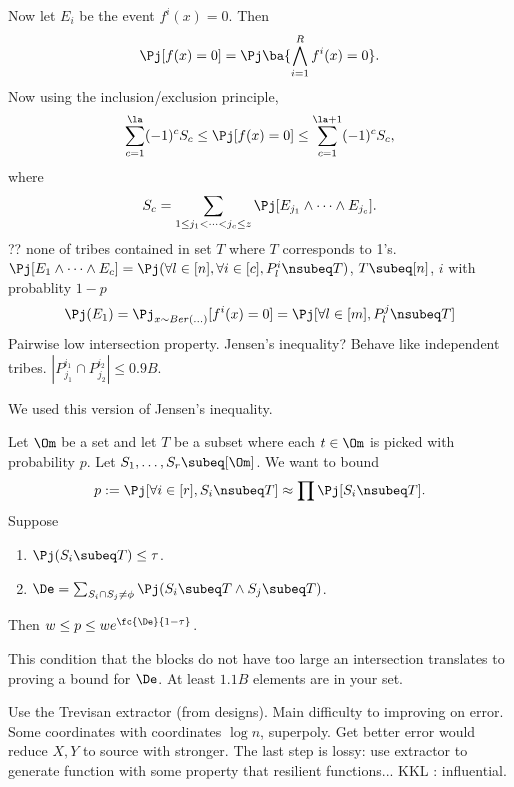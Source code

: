 \begin{enumerate}
Now let $E_i$ be the event $f^i(x)=0$. Then 
\[
\Pj[f(x)=0] = \Pj\ba{\bigwedge_{i=1}^R f^i(x)=0}.
\]
Now using the inclusion/exclusion principle,
\[%
\sum_{c=1}^\la (-1)^c S_c \le \Pj[f(x)=0]\le \sum_{c=1}^{\la + 1} (-1)^c S_c,
\]
where
\[
S_c=\sum_{1\le j_1<\cdots <j_c\le z} \Pj[E_{j_1}\wedge\cdots \wedge E_{j_c}].
\]
?? none of tribes contained in set $T$ where $T$ corresponds to 1's. $\Pj[E_1\wedge\cdots \wedge E_c]=\Pj(\forall l\in [n], \forall i\in [c], P_l^i\nsubeq T)$, $T\subeq [n]$, $i$ with probablity $1-p$
\[
\Pj(E_1)=\Pj_{x\sim Ber(...)} [f^i(x)=0] = \Pj[\forall l\in [m], P^j_l \nsubeq T]
\]
Pairwise low intersection property. Jensen's inequality? Behave like independent tribes.
$|P_{j_1}^{i_1}\cap P_{j_2}^{i_2}|\le 0.9B$. %

We used this version of Jensen's inequality.
\begin{thm}
Let $\Om$ be a set and let $T$ be a subset where each $t\in \Om$ is picked with probability $p$. Let $S_1,\ldots, S_r\subeq [\Om]$. We want to bound 
\[
p:=\Pj[\forall i\in [r], S_i\nsubeq T]\approx \prod\Pj [S_i\nsubeq T].
\]
Suppose 
\begin{enumerate}
\item
$\Pj(S_i\subeq T)\le \tau$.
\item
$\De = \sum_{S_i\cap S_j\ne \phi} \Pj(S_i\subeq T\wedge S_j\subeq T)$. 
\end{enumerate}
Then $w\le p \le we^{\fc{\De}{1-\tau}}$. 
\end{thm}
This condition that the blocks do not have too large an intersection translates to proving a bound for $\De$. At least $1.1B$ elements are in your set.
\end{enumerate}
Use the Trevisan extractor (from designs). Main difficulty to improving on error. Some coordinates with coordinates $\log n$, superpoly. Get better error would reduce $X,Y$ to source with stronger. %
The last step is lossy: use extractor to generate function with some property that resilient functions... KKL : influential.


